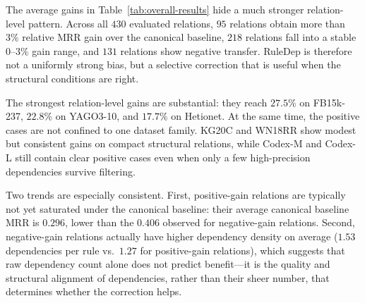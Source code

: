 
The average gains in Table~\ref{tab:overall-results} hide a much stronger relation-level pattern. Across all $430$ evaluated relations, $95$ relations obtain more than $3\%$ relative MRR gain over the canonical baseline, $218$ relations fall into a stable $0$--$3\%$ gain range, and $131$ relations show negative transfer. RuleDep is therefore not a uniformly strong bias, but a selective correction that is useful when the structural conditions are right.

The strongest relation-level gains are substantial: they reach $27.5\%$ on FB15k-237, $22.8\%$ on YAGO3-10, and $17.7\%$ on Hetionet. At the same time, the positive cases are not confined to one dataset family. KG20C and WN18RR show modest but consistent gains on compact structural relations, while Codex-M and Codex-L still contain clear positive cases even when only a few high-precision dependencies survive filtering.

Two trends are especially consistent. First, positive-gain relations are typically not yet saturated under the canonical baseline: their average canonical baseline MRR is $0.296$, lower than the $0.406$ observed for negative-gain relations. Second, negative-gain relations actually have higher dependency density on average ($1.53$ dependencies per rule vs.~$1.27$ for positive-gain relations), which suggests that raw dependency count alone does not predict benefit---it is the quality and structural alignment of dependencies, rather than their sheer number, that determines whether the correction helps.

